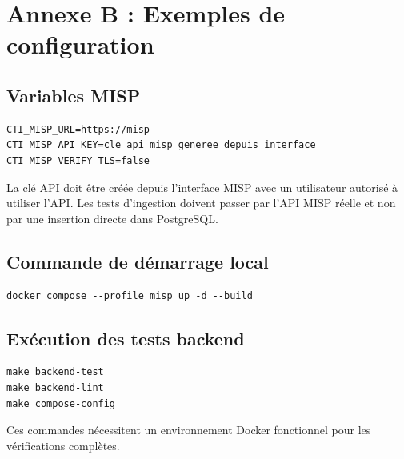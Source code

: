 \chapter{Annexe B : Exemples de configuration}

\section*{Variables MISP}

\begin{lstlisting}[style=code]
CTI_MISP_URL=https://misp
CTI_MISP_API_KEY=cle_api_misp_generee_depuis_interface
CTI_MISP_VERIFY_TLS=false
\end{lstlisting}

La clé API doit être créée depuis l'interface MISP avec un utilisateur autorisé à utiliser l'API. Les tests d'ingestion doivent passer par l'API MISP réelle et non par une insertion directe dans PostgreSQL.

\section*{Commande de démarrage local}

\begin{lstlisting}[style=code]
docker compose --profile misp up -d --build
\end{lstlisting}

\section*{Exécution des tests backend}

\begin{lstlisting}[style=code]
make backend-test
make backend-lint
make compose-config
\end{lstlisting}

Ces commandes nécessitent un environnement Docker fonctionnel pour les vérifications complètes.

